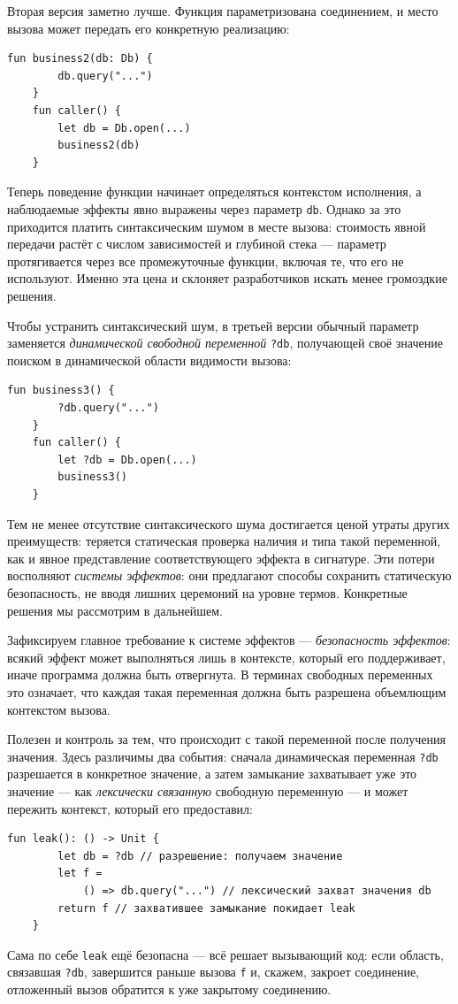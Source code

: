 \documentclass{ProcISPRAS}
\begin{document}
Вторая версия заметно лучше. Функция параметризована соединением, и место вызова
может передать его конкретную реализацию:
\begin{lstlisting}[language=colang]
    fun business2(db: Db) {
        db.query("...")
    }
    fun caller() {
        let db = Db.open(...)
        business2(db)
    }
\end{lstlisting}
Теперь поведение функции начинает определяться контекстом исполнения, а наблюдаемые
эффекты явно выражены через параметр \lstinline|db|. Однако за
это приходится платить синтаксическим шумом в месте вызова: стоимость явной передачи
растёт с числом зависимостей и глубиной стека --- параметр протягивается через все
промежуточные функции, включая те, что его не используют. Именно эта цена и склоняет
разработчиков искать менее громоздкие решения.

Чтобы устранить синтаксический шум, в третьей версии обычный параметр заменяется
\emph{динамической свободной переменной} \lstinline|?db|, получающей своё значение
поиском в динамической области видимости вызова:
\begin{lstlisting}[language=colang]
    fun business3() {
        ?db.query("...")
    }
    fun caller() {
        let ?db = Db.open(...)
        business3()
    }
\end{lstlisting}

Тем не менее отсутствие синтаксического шума достигается ценой утраты других преимуществ:
теряется статическая проверка
наличия и типа такой переменной, как и явное представление соответствующего эффекта в
сигнатуре.
Эти потери восполняют \emph{системы эффектов}: они предлагают способы сохранить статическую
безопасность, не вводя лишних церемоний на уровне термов.
Конкретные решения мы рассмотрим в дальнейшем.

Зафиксируем главное требование к системе эффектов --- \emph{безопасность эффектов}:
всякий эффект может выполняться лишь в контексте, который его поддерживает, иначе
программа должна быть отвергнута. В терминах свободных переменных это означает, что
каждая такая переменная должна быть разрешена объемлющим контекстом вызова.

Полезен и контроль за тем, что происходит с такой переменной после получения
значения. Здесь различимы два события: сначала динамическая переменная \lstinline|?db|
разрешается в конкретное значение, а затем замыкание захватывает уже это значение ---
как \emph{лексически связанную} свободную переменную --- и может пережить контекст,
который его предоставил:
\begin{lstlisting}[language=colang]
    fun leak(): () -> Unit {
        let db = ?db // разрешение: получаем значение
        let f =
            () => db.query("...") // лексический захват значения db
        return f // захватившее замыкание покидает leak
    }
\end{lstlisting}
Сама по себе \lstinline|leak| ещё безопасна --- всё решает вызывающий код: если
область, связавшая \lstinline|?db|, завершится раньше вызова \lstinline|f| и, скажем,
закроет соединение, отложенный вызов обратится к уже закрытому соединению.
\end{document}
